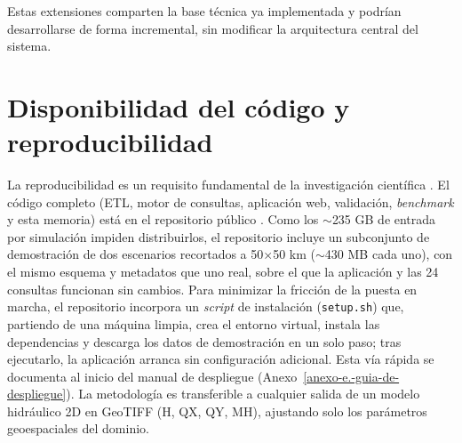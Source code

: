 Estas extensiones comparten la base técnica ya implementada y podrían desarrollarse de forma incremental, sin modificar la arquitectura central del sistema.

\section{Disponibilidad del código y reproducibilidad}\label{reproducibilidad}

La reproducibilidad es un requisito fundamental de la investigación científica \cite{reproducibilidad_ia}. El código completo (ETL, motor de consultas, aplicación web, validación, \textit{benchmark} y esta memoria) está en el repositorio público \cite{triton_spillway_repo}. Como los $\sim$235 GB de entrada por simulación impiden distribuirlos, el repositorio incluye un subconjunto de demostración de dos escenarios recortados a 50$\times$50 km ($\sim$430 MB cada uno), con el mismo esquema y metadatos que uno real, sobre el que la aplicación y las 24 consultas funcionan sin cambios. Para minimizar la fricción de la puesta en marcha, el repositorio incorpora un \textit{script} de instalación (\texttt{setup.sh}) que, partiendo de una máquina limpia, crea el entorno virtual, instala las dependencias y descarga los datos de demostración en un solo paso; tras ejecutarlo, la aplicación arranca sin configuración adicional. Esta vía rápida se documenta al inicio del manual de despliegue (Anexo~\ref{anexo-e.-guia-de-despliegue}). La metodología es transferible a cualquier salida de un modelo hidráulico 2D en GeoTIFF (H, QX, QY, MH), ajustando solo los parámetros geoespaciales del dominio.
